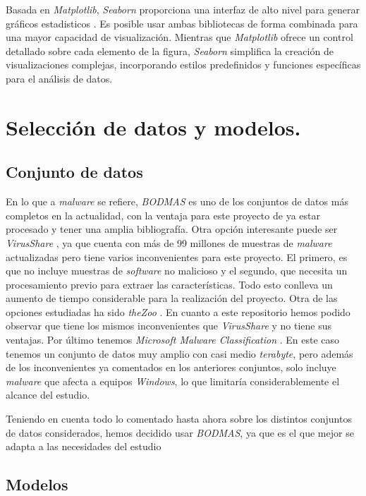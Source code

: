Basada en \textit{Matplotlib}, \textit{Seaborn} proporciona una interfaz de alto nivel para generar gráficos estadisticos \cite{seaborn}. Es posible usar ambas bibliotecas de forma combinada para una mayor capacidad de visualización. Mientras que \textit{Matplotlib} ofrece un control detallado sobre cada elemento de la figura, \textit{Seaborn} simplifica la creación de visualizaciones complejas, incorporando estilos predefinidos y funciones específicas para el análisis de datos.

\section{Selección de datos y modelos.}
\label{sec:select}

\subsection{Conjunto de datos}
\label{subsec:select_dataset}

En lo que a \textit{malware} se refiere, \textit{BODMAS} \cite{bodmas} es uno de los conjuntos de datos más completos en la actualidad, con la ventaja para este proyecto de ya estar procesado y tener una amplia bibliografía. Otra opción interesante puede ser \textit{VirusShare} \cite{virusshare}, ya que cuenta con más de 99 millones de muestras de \textit{malware} actualizadas pero tiene varios inconvenientes para este proyecto. El primero, es que no incluye muestras de \textit{software} no malicioso y el segundo, que necesita un procesamiento previo para extraer las características. Todo esto conlleva un aumento de tiempo considerable para la realización del proyecto. Otra de las opciones estudiadas ha sido \textit{theZoo} \cite{thezoo}. En cuanto a este repositorio hemos podido observar que tiene los mismos inconvenientes que \textit{VirusShare} y no tiene sus ventajas. Por último tenemos \textit{Microsoft Malware Classification} \cite{malware-classification}. En este caso tenemos un conjunto de datos muy amplio con casi medio \textit{terabyte}, pero además de los inconvenientes ya comentados en los anteriores conjuntos, solo incluye \textit{malware} que afecta a equipos \textit{Windows}, lo que limitaría considerablemente el alcance del estudio.

\vspace{1em}

Teniendo en cuenta todo lo comentado hasta ahora sobre los distintos conjuntos de datos considerados, hemos decidido usar \textit{BODMAS}, ya que es el que mejor se adapta a las necesidades del estudio

\subsection{Modelos}
\label{subsec:select_model}


